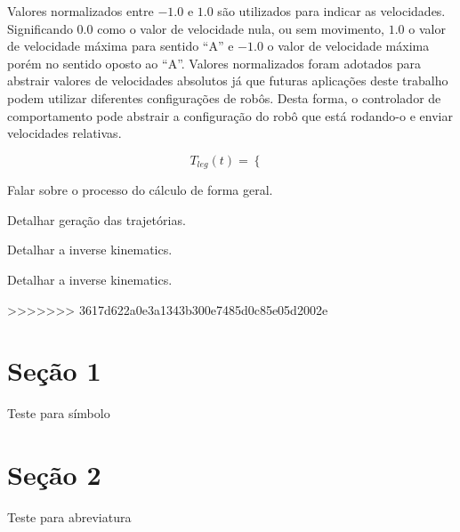 Valores normalizados entre $-1.0$ e $1.0$ são utilizados para indicar as velocidades. Significando $0.0$ como o valor de velocidade nula, ou sem movimento, $1.0$ o valor de velocidade máxima para sentido ``A'' e $-1.0$ o valor de velocidade máxima porém no sentido oposto ao ``A''. Valores normalizados foram adotados para abstrair valores de velocidades absolutos já que futuras aplicações deste trabalho podem utilizar diferentes configurações de robôs. Desta forma, o controlador de comportamento pode abstrair a configuração do robô que está rodando-o e enviar velocidades relativas.

\begin{equation}
	T_{leg}(t) = 
	\begin{cases}
		
	\end{cases}
\end{equation}

\begin{guide}
	Falar sobre o processo do cálculo de forma geral.
\end{guide}

\begin{guide}
	Detalhar geração das trajetórias.
\end{guide}

\begin{guide}
	Detalhar a inverse kinematics.
\end{guide}

\begin{guide}
	Detalhar a inverse kinematics.
\end{guide}
>>>>>>> 3617d622a0e3a1343b300e7485d0c85e05d2002e

\section{Seção 1}
\label{sec:Orientacao}

Teste para símbolo



\section{Seção 2}

Teste para abreviatura 


